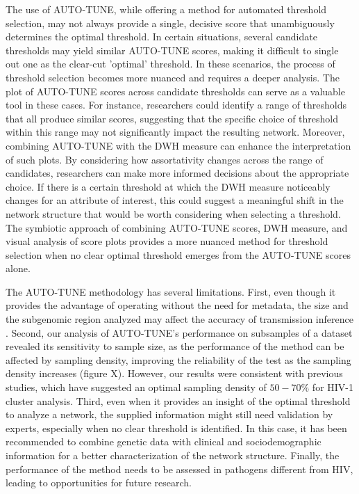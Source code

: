 \documentclass[utf8]{FrontiersinHarvard} %
\begin{document}
The use of AUTO-TUNE, while offering a method for automated threshold
selection, may not always provide a single, decisive score that unambiguously
determines the optimal threshold. In certain situations, several candidate
thresholds may yield similar AUTO-TUNE scores, making it difficult to single
out one as the clear-cut 'optimal' threshold. In these scenarios, the process
of threshold selection becomes more nuanced and requires a deeper analysis. The
plot of AUTO-TUNE scores across candidate thresholds can serve as a valuable
tool in these cases. For instance, researchers could identify a range of
thresholds that all produce similar scores, suggesting that the specific choice
of threshold within this range may not significantly impact the resulting
network. Moreover, combining AUTO-TUNE with the DWH measure can enhance the
interpretation of such plots. By considering how assortativity changes across
the range of candidates, researchers can make more informed decisions about the
appropriate choice. If there is a certain threshold at which the DWH measure
noticeably changes for an attribute of interest, this could suggest a
meaningful shift in the network structure that would be worth considering when
selecting a threshold. The symbiotic approach of combining AUTO-TUNE scores,
DWH measure, and visual analysis of score plots provides a more nuanced method
for threshold selection when no clear optimal threshold emerges from the
AUTO-TUNE scores alone.

The AUTO-TUNE methodology has several limitations. First, even though it
provides the advantage of operating without the need for metadata, the size and
the subgenomic region analyzed may affect the accuracy of transmission
inference \citep{junqueira_factors_2019}. Second, our analysis of AUTO-TUNE's
performance on subsamples of a dataset revealed its sensitivity to sample size,
as the performance of the method can be affected by sampling density, improving
the reliability of the test as the sampling density increases (figure X).
However, our results were consistent with previous studies, which have
suggested an optimal sampling density of $50-70\%$ for HIV-1 cluster
analysis\citep{novitsky_impact_2014}. Third, even when it provides an insight of
the optimal threshold to analyze a network, the supplied information might
still need validation by experts, especially when no clear threshold is
identified. In this case, it has been recommended to combine genetic data with
clinical and sociodemographic information for a better characterization of the
network structure. Finally, the performance of the method needs to be assessed
in pathogens different from HIV, leading to opportunities for future research.
\end{document}

